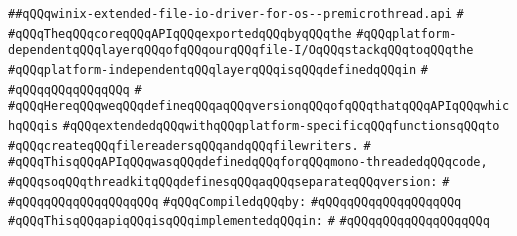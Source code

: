 \label{src/lib/std/src/io/winix-extended-file-io-driver-for-os--premicrothread.api}
\verb|##qQQqwinix-extended-file-io-driver-for-os--premicrothread.api|\newline
\verb|#|\newline
\verb|#qQQqTheqQQqcoreqQQqAPIqQQqexportedqQQqbyqQQqthe|\newline
\verb|#qQQqplatform-dependentqQQqlayerqQQqofqQQqourqQQqfile-I/OqQQqstackqQQqtoqQQqthe|\newline
\verb|#qQQqplatform-independentqQQqlayerqQQqisqQQqdefinedqQQqin|\newline
\verb|#|\newline
\verb|#qQQqqQQqqQQqqQQq|\newline
\verb|#|\newline
\verb|#qQQqHereqQQqweqQQqdefineqQQqaqQQqversionqQQqofqQQqthatqQQqAPIqQQqwhichqQQqis|\newline
\verb|#qQQqextendedqQQqwithqQQqplatform-specificqQQqfunctionsqQQqto|\newline
\verb|#qQQqcreateqQQqfilereadersqQQqandqQQqfilewriters.|\newline
\verb|#|\newline
\verb|#qQQqThisqQQqAPIqQQqwasqQQqdefinedqQQqforqQQqmono-threadedqQQqcode,|\newline
\verb|#qQQqsoqQQqthreadkitqQQqdefinesqQQqaqQQqseparateqQQqversion:|\newline
\verb|#|\newline
\verb|#qQQqqQQqqQQqqQQqqQQq|\newline
\newline
\verb|#qQQqCompiledqQQqby:|\newline
\verb|#qQQqqQQqqQQqqQQqqQQq|\newline
\newline
\newline
\newline
\verb|#qQQqThisqQQqapiqQQqisqQQqimplementedqQQqin:|\newline
\verb|#|\newline
\verb|#qQQqqQQqqQQqqQQqqQQq|\newline
